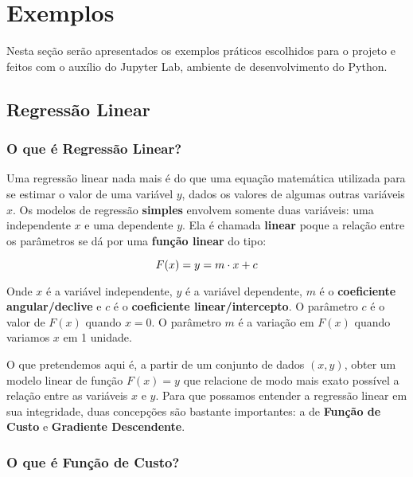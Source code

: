 \chapter{Exemplos}

Nesta seção serão apresentados os exemplos práticos escolhidos para o projeto e feitos com o auxílio do Jupyter Lab, ambiente de desenvolvimento do Python.

\section{Regressão Linear}

\subsection{O que é Regressão Linear?}
\label{sec:wifi}

Uma regressão linear nada mais é do que uma equação matemática utilizada para se estimar o valor de uma variável \(y\), dados os valores de algumas outras variáveis \(x\). Os modelos de regressão \textbf{simples} envolvem somente duas variáveis: uma independente \(x\) e uma dependente \(y\). Ela é chamada \textbf{linear} poque a relação entre os parâmetros se dá por uma \textbf{função linear} do tipo:

\[ \large F(x) = y = m \cdot x + c \]

Onde \(x\) é a variável independente, \(y\) é a variável dependente, \(m\) é o \textbf{coeficiente angular/declive} e \(c\) é o \textbf{coeficiente linear/intercepto}. O parâmetro \(c\) é o valor de \(F(x)\) quando \(x = 0\). O parâmetro \(m\) é a variação em \(F(x)\) quando variamos $x$ em 1 unidade.

O que pretendemos aqui é, a partir de um conjunto de dados $(x,y)$, obter um modelo linear de função $F(x) = y$ que relacione de modo mais exato possível a relação entre  as variáveis $x$ e $y$. Para que possamos entender a regressão linear em sua integridade, duas concepções são bastante importantes: a de \textbf{Função de Custo} e \textbf{Gradiente Descendente}. 



\subsection{O que é Função de Custo?}
\label{sec:bt}

